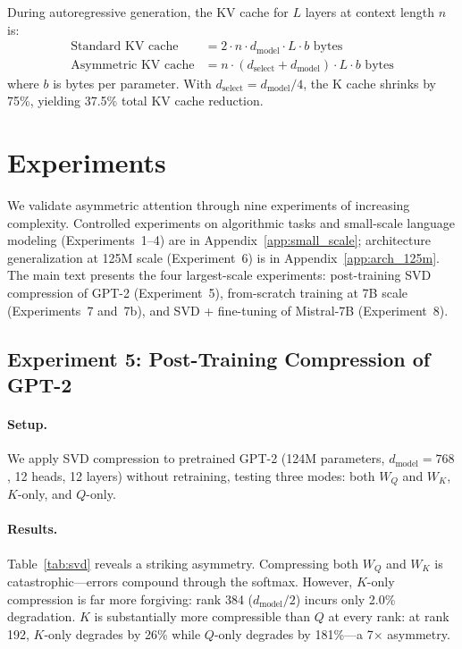 \documentclass{article} %
\newcommand{\dmodel}{d_{\text{model}}}
\newcommand{\dselect}{d_{\text{select}}}
\begin{document}
During autoregressive generation, the KV cache for $L$ layers at context length $n$ is:
\begin{align}
\text{Standard KV cache} &= 2 \cdot n \cdot \dmodel \cdot L \cdot b \text{ bytes} \\
\text{Asymmetric KV cache} &= n \cdot (\dselect + \dmodel) \cdot L \cdot b \text{ bytes}
\end{align}
where $b$ is bytes per parameter. With $\dselect = \dmodel / 4$, the K cache shrinks by 75\%, yielding 37.5\% total KV cache reduction.


\section{Experiments}

We validate asymmetric attention through nine experiments of increasing complexity. Controlled experiments on algorithmic tasks and small-scale language modeling (Experiments~1--4) are in Appendix~\ref{app:small_scale}; architecture generalization at 125M scale (Experiment~6) is in Appendix~\ref{app:arch_125m}. The main text presents the four largest-scale experiments: post-training SVD compression of GPT-2 (Experiment~5), from-scratch training at 7B scale (Experiments~7 and~7b), and SVD + fine-tuning of Mistral-7B (Experiment~8).


\subsection{Experiment 5: Post-Training Compression of GPT-2}

\paragraph{Setup.}
We apply SVD compression to pretrained GPT-2 (124M parameters, $\dmodel = 768$, 12 heads, 12 layers) without retraining, testing three modes: both $W_Q$ and $W_K$, $K$-only, and $Q$-only.

\paragraph{Results.}
Table~\ref{tab:svd} reveals a striking asymmetry. Compressing both $W_Q$ and $W_K$ is catastrophic---errors compound through the softmax. However, $K$-only compression is far more forgiving: rank 384 ($\dmodel/2$) incurs only 2.0\% degradation. $K$ is substantially more compressible than $Q$ at every rank: at rank 192, $K$-only degrades by 26\% while $Q$-only degrades by 181\%---a 7$\times$ asymmetry.
\end{document}
